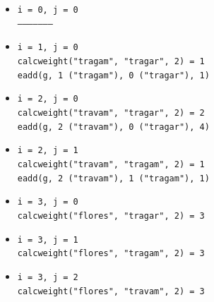\documentclass[a4paper, 18pt]{article}
\begin{document}
	\begin{itemize}
		\item
			\texttt{i = 0, j = 0} \\
			\texttt{---------------------}
		\item
			\texttt{i = 1, j = 0} \\
			\texttt{calc\textunderscore weight("tragam", "tragar", 2) = 1} \\
			\texttt{e\textunderscore add(g, 1 ("tragam"), 0 ("tragar"), 1)}
		\item
			\texttt{i = 2, j = 0} \\
			\texttt{calc\textunderscore weight("travam", "tragar", 2) = 2} \\
			\texttt{e\textunderscore add(g, 2 ("travam"), 0 ("tragar"), 4)}
		\item
			\texttt{i = 2, j = 1} \\
			\texttt{calc\textunderscore weight("travam", "tragam", 2) = 1} \\
			\texttt{e\textunderscore add(g, 2 ("travam"), 1 ("tragam"), 1)}
		\item
			\texttt{i = 3, j = 0} \\
			\texttt{calc\textunderscore weight("flores", "tragar", 2) = 3}
		\item
			\texttt{i = 3, j = 1} \\
			\texttt{calc\textunderscore weight("flores", "tragam", 2) = 3}
		\item
			\texttt{i = 3, j = 2} \\
			\texttt{calc\textunderscore weight("flores", "travam", 2) = 3}
	\end{itemize}
\end{document}
